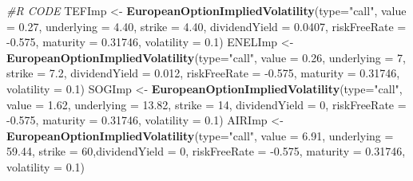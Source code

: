 \documentclass[
  12pt,
  a4paper,
  openany]{book}
\newenvironment{Shaded}{\begin{snugshade}}{\end{snugshade}}
\newcommand{\CommentTok}[1]{\textcolor[rgb]{0.56,0.35,0.01}{\textit{#1}}}
\newcommand{\DataTypeTok}[1]{\textcolor[rgb]{0.13,0.29,0.53}{#1}}
\newcommand{\DecValTok}[1]{\textcolor[rgb]{0.00,0.00,0.81}{#1}}
\newcommand{\FloatTok}[1]{\textcolor[rgb]{0.00,0.00,0.81}{#1}}
\newcommand{\KeywordTok}[1]{\textcolor[rgb]{0.13,0.29,0.53}{\textbf{#1}}}
\newcommand{\NormalTok}[1]{#1}
\newcommand{\StringTok}[1]{\textcolor[rgb]{0.31,0.60,0.02}{#1}}
\begin{document}
\begin{Shaded}
\begin{Highlighting}[]
\CommentTok{\#R CODE}
\NormalTok{TEFImp \textless{}{-}}\StringTok{ }\KeywordTok{EuropeanOptionImpliedVolatility}\NormalTok{(}\DataTypeTok{type=}\StringTok{"call"}\NormalTok{, }\DataTypeTok{value =} \FloatTok{0.27}\NormalTok{, }\DataTypeTok{underlying =} \FloatTok{4.40}\NormalTok{, }\DataTypeTok{strike =} \FloatTok{4.40}\NormalTok{,}
                                          \DataTypeTok{dividendYield =} \FloatTok{0.0407}\NormalTok{, }\DataTypeTok{riskFreeRate =} \FloatTok{{-}0.575}\NormalTok{, }
                                          \DataTypeTok{maturity =} \FloatTok{0.31746}\NormalTok{, }\DataTypeTok{volatility =} \FloatTok{0.1}\NormalTok{)}
\NormalTok{ENELImp \textless{}{-}}\StringTok{ }\KeywordTok{EuropeanOptionImpliedVolatility}\NormalTok{(}\DataTypeTok{type=}\StringTok{"call"}\NormalTok{, }\DataTypeTok{value =} \FloatTok{0.26}\NormalTok{, }\DataTypeTok{underlying =} \DecValTok{7}\NormalTok{, }\DataTypeTok{strike =} \FloatTok{7.2}\NormalTok{,}
                                           \DataTypeTok{dividendYield =} \FloatTok{0.012}\NormalTok{, }\DataTypeTok{riskFreeRate =} \FloatTok{{-}0.575}\NormalTok{,}
                                           \DataTypeTok{maturity =} \FloatTok{0.31746}\NormalTok{, }\DataTypeTok{volatility =} \FloatTok{0.1}\NormalTok{)}
\NormalTok{SOGImp \textless{}{-}}\StringTok{ }\KeywordTok{EuropeanOptionImpliedVolatility}\NormalTok{(}\DataTypeTok{type=}\StringTok{"call"}\NormalTok{, }\DataTypeTok{value =} \FloatTok{1.62}\NormalTok{, }\DataTypeTok{underlying =} \FloatTok{13.82}\NormalTok{, }\DataTypeTok{strike =} \DecValTok{14}\NormalTok{,}
                                          \DataTypeTok{dividendYield =} \DecValTok{0}\NormalTok{, }\DataTypeTok{riskFreeRate =} \FloatTok{{-}0.575}\NormalTok{, }\DataTypeTok{maturity =} \FloatTok{0.31746}\NormalTok{, }
                                          \DataTypeTok{volatility =} \FloatTok{0.1}\NormalTok{)}
\NormalTok{AIRImp \textless{}{-}}\StringTok{ }\KeywordTok{EuropeanOptionImpliedVolatility}\NormalTok{(}\DataTypeTok{type=}\StringTok{"call"}\NormalTok{, }\DataTypeTok{value =} \FloatTok{6.91}\NormalTok{, }\DataTypeTok{underlying =} \FloatTok{59.44}\NormalTok{, }
                                          \DataTypeTok{strike =} \DecValTok{60}\NormalTok{,}\DataTypeTok{dividendYield =} \DecValTok{0}\NormalTok{, }\DataTypeTok{riskFreeRate =} \FloatTok{{-}0.575}\NormalTok{, }
                                          \DataTypeTok{maturity =} \FloatTok{0.31746}\NormalTok{, }\DataTypeTok{volatility =} \FloatTok{0.1}\NormalTok{)}
\end{Highlighting}
\end{Shaded}
\end{document}
